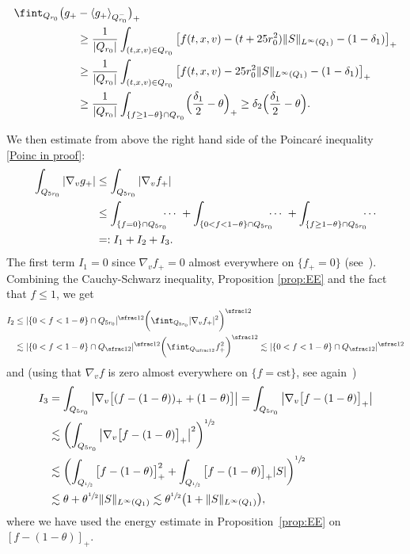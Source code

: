 \begin{equation}\label{lower bd Poinc}
\begin{aligned}
\fint_{Q_{r_0}} \bigl(g_+&-\langle g_+
\rangle_{Q_{r_0}^{-}}\bigr)_{+} \\
&\ge \frac{1}{|Q_{r_0}|} \int_{(t,x,v) \in Q_{r_0}}
\big[ f(t,x,v) - (t+25r_0^2) \|S\|_{L^\infty(Q_1)}
-(1-\delta_1)\big]_{+}\\
&\ge \frac{1}{|Q_{r_0}|} \int_{(t,x,v) \in Q_{r_0}}
\big[ f(t,x,v) - 25r_0^2 \|S\|_{L^\infty(Q_1)}
-(1-\delta_1)\big]_{+}\\
&\geq \frac{1}{|Q_{r_0}|}
\int_{\{f\geq 1-\theta\}\cap Q_{r_0}}
\Bigl(\frac{\delta_1}{2}-\theta\Bigr)_{+}
\ge \delta_2 \Bigl(\frac{\delta_1}{2}-\theta\Bigr).
\end{aligned}
\end{equation}

We then estimate from above the right hand side of the Poincaré
inequality \eqref{Poinc in proof}:\vspace*{-3pt}
\begin{align*}
\int_{Q_{5r_0}} |\nabla_v g_+| &\le \int_{Q_{5r_0}}
|\nabla_v f_+| \\
&\le \int_{\{ f=0 \} \cap Q_{5r_0}} \hspace*{-2mm}\cdots\
+\int_{\{ 0<f<1-\theta \} \cap Q_{5r_0}} \hspace*{-2mm}\cdots\
+ \int_{\{ f\geq 1-\theta \} \cap Q_{5r_0}} \hspace*{-2mm}\cdots\\
&=: I_1 +I_2 + I_3.
\end{align*}
The first term $I_1=0$ since $\nabla_v f_+ = 0$ almost everywhere
on $\{f_+=0\}$
(see~\cite[\S 4.2.2]{MR3409135}). Combining the
Cauchy-Schwarz inequality, Proposition \ref{prop:EE} and the fact
that $f\leq 1$, we get
\begin{align*}
I_2& \leq |\{0<f<1-\theta\}\cap Q_{5r_0}|^{\sfrac12}\biggl(
\fint_{Q_{5r_0}} |\nabla_v f_+|^2 \biggr)^{\sfrac12} \\
& \lesssim
|\{0<f<1-\theta\}\cap Q_{\sfrac12}|^{\sfrac12}
\biggl(\fint_{Q_{\sfrac12}} f_+^2 \biggr)^{\sfrac12}
\lesssim |\{0<f<1-\theta\}\cap Q_{\sfrac12}|^{\sfrac12}
\end{align*}
and (using that $\nabla_v f$ is zero almost everywhere on
$\{ f = \text{cst} \}$, see
again~\cite[\S 4.2.2]{MR3409135})
\begin{align*}
I_3 &= \int_{Q_{5r_0}} \big|\nabla_v
\big[(f-(1-\theta))_+ +(1-\theta) \big]\big|= \int_{Q_{5r_0}}
\big|\nabla_v \big[f-(1-\theta)\big]_+\big| \\
&\lesssim \biggl( \int_{Q_{5r_0}}
\big|\nabla_v \big[f-(1-\theta)\big]_+\big|^2
\biggr)^{\sfrac12} \\
&\lesssim \biggl( \int_{Q_{\sfrac12}}
\big[f-(1-\theta)\big]_+^2
+ \int_{Q_{\sfrac12}}
\big[f-(1-\theta)\big]_+ |S| \biggr)^{\sfrac12}\\
&\lesssim \theta + \theta^{\sfrac12}\|S\|_{L^\infty(Q_1)}
\lesssim \theta^{\sfrac12}\bigl(1+\|S\|_{L^\infty(Q_1)}\bigr),
\end{align*}
where we have used the energy estimate in
Proposition~\ref{prop:EE} on $[f-(1-\theta)]_+$.

